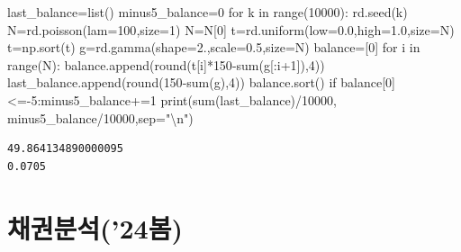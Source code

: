 \documentclass[
  letterpaper,
  DIV=11,
  numbers=noendperiod]{scrreprt}
\newenvironment{Shaded}{\begin{snugshade}}{\end{snugshade}}
\newcommand{\BuiltInTok}[1]{\textcolor[rgb]{0.00,0.23,0.31}{#1}}
\newcommand{\CharTok}[1]{\textcolor[rgb]{0.13,0.47,0.30}{#1}}
\newcommand{\ControlFlowTok}[1]{\textcolor[rgb]{0.00,0.23,0.31}{#1}}
\newcommand{\DecValTok}[1]{\textcolor[rgb]{0.68,0.00,0.00}{#1}}
\newcommand{\FloatTok}[1]{\textcolor[rgb]{0.68,0.00,0.00}{#1}}
\newcommand{\KeywordTok}[1]{\textcolor[rgb]{0.00,0.23,0.31}{#1}}
\newcommand{\NormalTok}[1]{\textcolor[rgb]{0.00,0.23,0.31}{#1}}
\newcommand{\OperatorTok}[1]{\textcolor[rgb]{0.37,0.37,0.37}{#1}}
\newcommand{\StringTok}[1]{\textcolor[rgb]{0.13,0.47,0.30}{#1}}
\begin{document}
\begin{Shaded}
\begin{Highlighting}[]
\NormalTok{last\_balance}\OperatorTok{=}\BuiltInTok{list}\NormalTok{()}
\NormalTok{minus5\_balance}\OperatorTok{=}\DecValTok{0}
\ControlFlowTok{for}\NormalTok{ k }\KeywordTok{in} \BuiltInTok{range}\NormalTok{(}\DecValTok{10000}\NormalTok{):}
\NormalTok{    rd.seed(k)}
\NormalTok{    N}\OperatorTok{=}\NormalTok{rd.poisson(lam}\OperatorTok{=}\DecValTok{100}\NormalTok{,size}\OperatorTok{=}\DecValTok{1}\NormalTok{)}
\NormalTok{    N}\OperatorTok{=}\NormalTok{N[}\DecValTok{0}\NormalTok{]}
\NormalTok{    t}\OperatorTok{=}\NormalTok{rd.uniform(low}\OperatorTok{=}\FloatTok{0.0}\NormalTok{,high}\OperatorTok{=}\FloatTok{1.0}\NormalTok{,size}\OperatorTok{=}\NormalTok{N)}
\NormalTok{    t}\OperatorTok{=}\NormalTok{np.sort(t)}
\NormalTok{    g}\OperatorTok{=}\NormalTok{rd.gamma(shape}\OperatorTok{=}\FloatTok{2.}\NormalTok{,scale}\OperatorTok{=}\FloatTok{0.5}\NormalTok{,size}\OperatorTok{=}\NormalTok{N)}
\NormalTok{    balance}\OperatorTok{=}\NormalTok{[}\DecValTok{0}\NormalTok{]}
    \ControlFlowTok{for}\NormalTok{ i }\KeywordTok{in} \BuiltInTok{range}\NormalTok{(N):}
\NormalTok{        balance.append(}\BuiltInTok{round}\NormalTok{(t[i]}\OperatorTok{*}\DecValTok{150}\OperatorTok{{-}}\BuiltInTok{sum}\NormalTok{(g[:i}\OperatorTok{+}\DecValTok{1}\NormalTok{]),}\DecValTok{4}\NormalTok{))}
\NormalTok{    last\_balance.append(}\BuiltInTok{round}\NormalTok{(}\DecValTok{150}\OperatorTok{{-}}\BuiltInTok{sum}\NormalTok{(g),}\DecValTok{4}\NormalTok{))}
\NormalTok{    balance.sort()}
    \ControlFlowTok{if}\NormalTok{ balance[}\DecValTok{0}\NormalTok{]}\OperatorTok{\textless{}={-}}\DecValTok{5}\NormalTok{:minus5\_balance}\OperatorTok{+=}\DecValTok{1}
\BuiltInTok{print}\NormalTok{(}\BuiltInTok{sum}\NormalTok{(last\_balance)}\OperatorTok{/}\DecValTok{10000}\NormalTok{,}
\NormalTok{      minus5\_balance}\OperatorTok{/}\DecValTok{10000}\NormalTok{,sep}\OperatorTok{=}\StringTok{"}\CharTok{\textbackslash{}n}\StringTok{"}\NormalTok{)}
\end{Highlighting}
\end{Shaded}

\begin{verbatim}
49.864134890000095
0.0705
\end{verbatim}

\part{채권분석('24봄)}
\end{document}

